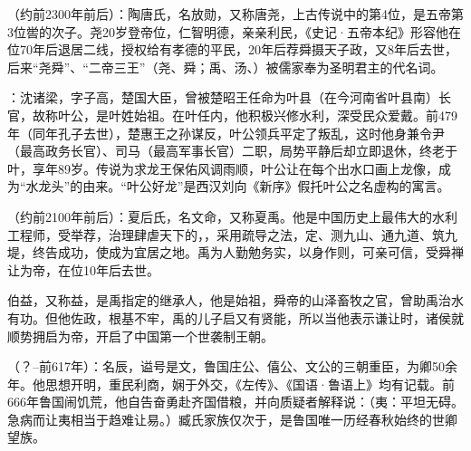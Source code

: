 （约前2300年前后）：陶唐氏，名放勋，又称唐尧，上古传说中的第4位，是五帝第3位喾的次子。尧20岁登帝位，仁智明德，亲亲利民，《史记·五帝本纪》形容他在位70年后退居二线，授权给有孝德的平民，20年后荐舜摄天子政，又8年后去世，后来“尧舜”、“二帝三王”（尧、舜；禹、汤、）被儒家奉为圣明君主的代名词。

：沈诸梁，字子高，楚国大臣，曾被楚昭王任命为叶县（在今河南省叶县南）长官，故称叶公，是叶姓始祖。在叶任内，他积极兴修水利，深受民众爱戴。前479年（同年孔子去世），楚惠王之孙谋反，叶公领兵平定了叛乱，这时他身兼令尹（最高政务长官）、司马（最高军事长官）二职，局势平静后却立即退休，终老于叶，享年89岁。传说为求龙王保佑风调雨顺，叶公让在每个出水口画上龙像，成为“水龙头”的由来。“叶公好龙”是西汉刘向《新序》假托叶公之名虚构的寓言。 %

（约前2100年前后）：夏后氏，名文命，又称夏禹。他是中国历史上最伟大的水利工程师，受举荐，治理肆虐天下的，，采用疏导之法，定、测九山、通九道、筑九堤，终告成功，使成为宜居之地。禹为人勤勉务实，以身作则，可亲可信，受舜禅让为帝，在位10年后去世。

伯益，又称益，是禹指定的继承人，他是始祖，舜帝的山泽畜牧之官，曾助禹治水有功。但他佐政，根基不牢，禹的儿子启又有贤能，所以当他表示谦让时，诸侯就顺势拥启为帝，开启了中国第一个世袭制王朝。%

（？--前617年）：名辰，谥号是文，鲁国庄公、僖公、文公的三朝重臣，为卿50余年。他思想开明，重民利商，娴于外交，《左传》、《国语·鲁语上》均有记载。前666年鲁国闹饥荒，他自告奋勇赴齐国借粮，并向质疑者解释说：（夷：平坦无碍。急病而让夷相当于趋难让易。）臧氏家族仅次于，是鲁国唯一历经春秋始终的世卿望族。


